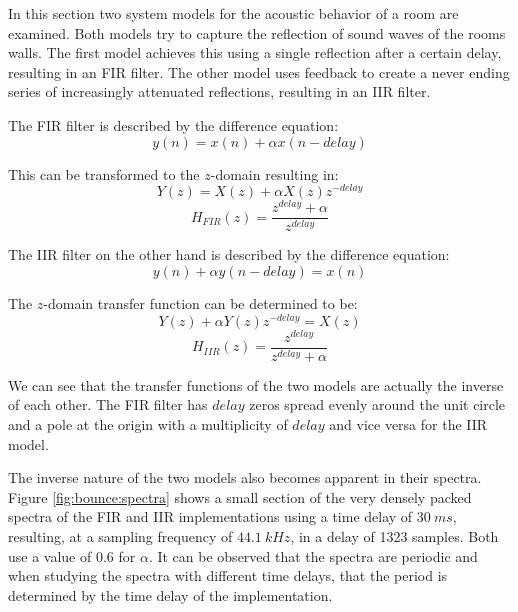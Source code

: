 \documentclass[journal]{IEEEtran}
\begin{document}
In this section two system models for the acoustic behavior of a room are examined. Both models try to capture the reflection of sound waves of the rooms walls. The first model achieves this using a single reflection after a certain delay, resulting in an FIR filter. The other model uses feedback to create a never ending series of increasingly attenuated reflections, resulting in an IIR filter.

The FIR filter is described by the difference equation:
\begin{equation}
    y(n) = x(n) + \alpha x(n-delay)
\end{equation}

This can be transformed to the $z$-domain resulting in:
 \begin{equation}
     Y(z) = X(z) + \alpha X(z) z^{-delay}
 \end{equation}
 \begin{equation}
     H_{FIR}(z) = \frac{z^{delay} + \alpha}{z^{delay}}
\end{equation}

The IIR filter on the other hand is described by the difference equation:
\begin{equation}
    y(n) + \alpha y(n-delay) = x(n)
\end{equation}

The $z$-domain transfer function can be determined to be:
\begin{equation}
    Y(z) + \alpha Y(z) z^{-delay} = X(z)
\end{equation}
\begin{equation}
    H_{IIR}(z) = \frac{z^{delay}}{z^{delay} + \alpha}
\end{equation}

We can see that the transfer functions of the two models are actually the inverse of each other. The FIR filter has $delay$ zeros spread evenly around the unit circle and a pole at the origin with a multiplicity of $delay$ and vice versa for the IIR model.

The inverse nature of the two models also becomes apparent in their spectra. Figure \ref{fig:bounce:spectra} shows a small section of the very densely packed spectra of the FIR and IIR implementations using a time delay of $\SI{30}{ms}$, resulting, at a sampling frequency of $\SI{44.1}{kHz}$, in a delay of 1323 samples. Both use a value of 0.6 for $\alpha$. It can be observed that the spectra are periodic and when studying the spectra with different time delays, that the period is determined by the time delay of the implementation.
\end{document}
